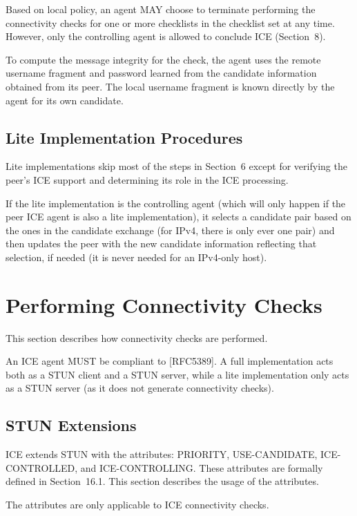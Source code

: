 \documentclass{article}
\begin{document}
Based on local policy, an agent MAY choose to terminate performing the connectivity checks for one or more checklists in the checklist set at any time.  However, only the controlling agent is allowed to conclude ICE (Section~8).

To compute the message integrity for the check, the agent uses the remote username fragment and password learned from the candidate information obtained from its peer.  The local username fragment is known directly by the agent for its own candidate.

\subsection{Lite Implementation Procedures}

Lite implementations skip most of the steps in Section~6 except for verifying the peer's ICE support and determining its role in the ICE processing.

If the lite implementation is the controlling agent (which will only happen if the peer ICE agent is also a lite implementation), it selects a candidate pair based on the ones in the candidate exchange (for IPv4, there is only ever one pair) and then updates the peer with the new candidate information reflecting that selection, if needed (it is never needed for an IPv4-only host).

\section{Performing Connectivity Checks}

This section describes how connectivity checks are performed.

An ICE agent MUST be compliant to [RFC5389].  A full implementation acts both as a STUN client and a STUN server, while a lite implementation only acts as a STUN server (as it does not generate connectivity checks).

\subsection{STUN Extensions}

ICE extends STUN with the attributes: PRIORITY, USE-CANDIDATE, ICE- CONTROLLED, and ICE-CONTROLLING.  These attributes are formally defined in Section~16.1.  This section describes the usage of the attributes.

The attributes are only applicable to ICE connectivity checks.
\end{document}
